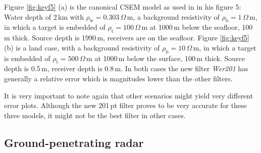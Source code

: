 \documentclass[paper,twocolumn,twoside]{geophysics}
\newcommand{\rmk}[1]{\textbf{\color{red}{#1}}}
\newcommand{\mr}[1]{\mathrm{#1}}
\begin{document}
Figure \ref{fig:keyf5} (a) is the canonical CSEM model as used in
\cite{GEO.12.Key} in his figure 5: Water depth of 2\,km with
$\rho_\mr{w}=0.303\,\Omega\,$m, a background resistivity of
$\rho_\mr{b}=1\,\Omega\,$m, in which a target is embedded of
$\rho_\mr{t}=100\,\Omega\,$m at 1000\,m below the seafloor, 100\,m thick.
Source depth is 1990\,m, receivers are on the seafloor.
%
%
Figure \ref{fig:keyf5} (b) is a land case, with a background resistivity of
$\rho_\mr{b}=10\,\Omega\,$m, in which a target is embedded of
$\rho_\mr{t}=500\,\Omega\,$m at 1000\,m below the surface, 100\,m thick. Source
depth is 0.5\,m, receiver depth is 0.8\,m. In both cases the new filter
\emph{Wer201} has generally a relative error which is magnitudes lower than the
other filters.

It is very important to note again that other scenarios might yield very
different error plots. Although the new 201\,pt filter proves to be very
accurate for these three models, it might not be the best filter in other
cases.

\subsection{Ground-penetrating radar}

\rmk{TODO: Add second GPR result; layers swapped}
\end{document}
